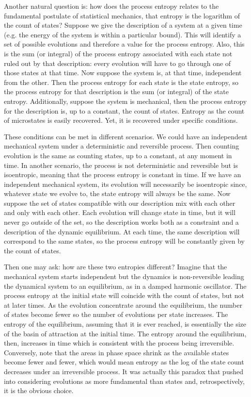 \documentclass[letterpaper,twocolumn]{article}
\begin{document}
Another natural question is: how does the process entropy relates to the fundamental postulate of statistical mechanics, that entropy is the logarithm of the count of states?
Suppose we give the description of a system at a given time (e.g. the energy of the system is within a particular bound). This will identify a set of possible evolutions and therefore a value for the process entropy. Also, this is the sum (or integral) of the process entropy associated with each state not ruled out by that description: every evolution will have to go through one of those states at that time. Now suppose the system is, at that time, independent from the other. Then the process entropy for each state is the state entropy, so the process entropy for that description is the sum (or integral) of the state entropy. Additionally, suppose the system is mechanical, then the process entropy for the description is, up to a constant, the count of states. Entropy as the count of microstates is easily recovered. Yet, it is recovered under specific conditions.

These conditions can be met in different scenarios. We could have an independent mechanical system under a deterministic and reversible process. Then counting evolution is the same as counting states, up to a constant, at any moment in time. In another scenario, the process is not deterministic and reversible but is isoentropic, meaning that the process entropy is constant in time. If we have an independent mechanical system, its evolution will necessarily be isoentropic since, whatever state we evolve to, the state entropy will always be the same. Now suppose the set of states compatible with our description mix with each other and only with each other. Each evolution will change state in time, but it will never go outside of the set, so the description works both as a constraint and a description of the dynamic equilibrium. At each time, the same description will correspond to the same states, so the process entropy will be constantly given by the count of states.

Then one may ask: how are these two entropies different? Imagine that the mechanical system starts independent but the dynamics is non-reversible leading the dynamical system to an equilibrium, as in a damped harmonic oscillator. The process entropy at the initial state will coincide with the count of states, but not at later times. As the evolution concentrate around the equilibrium, the number of states become fewer so the number of evolutions per state increases. The entropy of the equilibrium, assuming that it is ever reached, is essentially the size of the basin of attraction at the initial time. The entropy around the equilibrium, then, increases in time which is consistent with the process being irreversible. Conversely, note that the areas in phase space shrink as the available states become fewer and fewer, which would mean entropy as the log of the state count decreases under an irreversible process. It was actually this paradox that pushed into considering evolutions as more fundamental than states and, retrospectively, it is the obvious choice.
\end{document}
